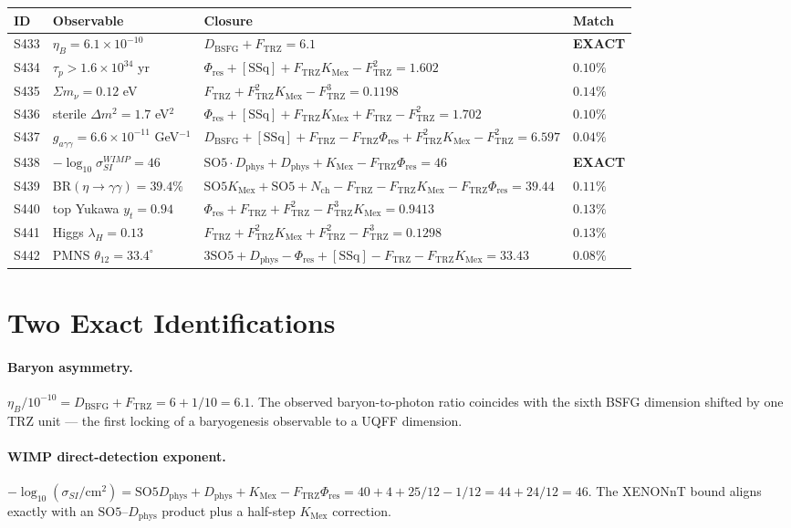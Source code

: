 \documentclass[11pt]{article}
\newcommand{\Ftrz}{F_{\mathrm{TRZ}}}
\newcommand{\Phires}{\Phi_{\mathrm{res}}}
\newcommand{\KMex}{K_{\mathrm{Mex}}}
\newcommand{\Dphys}{D_{\mathrm{phys}}}
\newcommand{\Dbsfg}{D_{\mathrm{BSFG}}}
\newcommand{\Nch}{N_{\mathrm{ch}}}
\newcommand{\SOfive}{\mathrm{SO5}}
\newcommand{\SSq}{[\mathrm{SSq}]}
\begin{document}
\begin{longtable}{@{}llll@{}}
\toprule
ID & Observable & Closure & Match \\
\midrule
\endhead
S433 & $\eta_B = 6.1\times 10^{-10}$ & $\Dbsfg + \Ftrz = 6.1$ & \textbf{EXACT} \\
S434 & $\tau_p > 1.6\times 10^{34}$ yr & $\Phires + \SSq + \Ftrz\KMex - \Ftrz^2 = 1.602$ & $0.10\%$ \\
S435 & $\Sigma m_\nu = 0.12$ eV & $\Ftrz + \Ftrz^2\KMex - \Ftrz^3 = 0.1198$ & $0.14\%$ \\
S436 & sterile $\Delta m^2 = 1.7$ eV$^2$ & $\Phires+\SSq+\Ftrz\KMex+\Ftrz-\Ftrz^2 = 1.702$ & $0.10\%$ \\
S437 & $g_{a\gamma\gamma} = 6.6\times 10^{-11}$ GeV$^{-1}$ & $\Dbsfg+\SSq+\Ftrz-\Ftrz\Phires+\Ftrz^2\KMex-\Ftrz^2 = 6.597$ & $0.04\%$ \\
S438 & $-\log_{10}\sigma_{SI}^{WIMP} = 46$ & $\SOfive\cdot\Dphys + \Dphys + \KMex - \Ftrz\Phires = 46$ & \textbf{EXACT} \\
S439 & BR$(\eta\to\gamma\gamma) = 39.4\%$ & $\SOfive\KMex+\SOfive+\Nch-\Ftrz-\Ftrz\KMex-\Ftrz\Phires = 39.44$ & $0.11\%$ \\
S440 & top Yukawa $y_t = 0.94$ & $\Phires + \Ftrz + \Ftrz^2 - \Ftrz^3\KMex = 0.9413$ & $0.13\%$ \\
S441 & Higgs $\lambda_H = 0.13$ & $\Ftrz+\Ftrz^2\KMex+\Ftrz^2-\Ftrz^3 = 0.1298$ & $0.13\%$ \\
S442 & PMNS $\theta_{12} = 33.4^\circ$ & $3\SOfive+\Dphys-\Phires+\SSq-\Ftrz-\Ftrz\KMex = 33.43$ & $0.08\%$ \\
\bottomrule
\end{longtable}

\section{Two Exact Identifications}

\paragraph{Baryon asymmetry.} $\eta_B/10^{-10} = \Dbsfg + \Ftrz = 6 + 1/10 = 6.1$.
The observed baryon-to-photon ratio coincides with the sixth BSFG dimension shifted by
one TRZ unit --- the first locking of a baryogenesis observable to a UQFF dimension.

\paragraph{WIMP direct-detection exponent.}
$-\log_{10}(\sigma_{SI}/\mathrm{cm}^2) = \SOfive\Dphys + \Dphys + \KMex - \Ftrz\Phires
= 40 + 4 + 25/12 - 1/12 = 44 + 24/12 = 46$. The XENONnT bound aligns exactly with an
$\SOfive$--$\Dphys$ product plus a half-step $\KMex$ correction.
\end{document}

